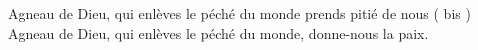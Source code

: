 Agneau de Dieu, qui enlèves le péché du monde prends pitié de nous ( bis )\\
Agneau de Dieu, qui enlèves le péché du monde, donne-nous la paix.
